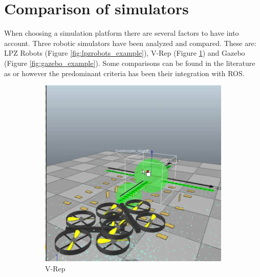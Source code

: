\section{Comparison of simulators} %
\label{sec:sim_comparison_of_simulators}
When choosing a simulation platform there are several factors to have into account.
Three robotic simulators have been analyzed and compared. 
These are: LPZ Robots \cite{lpzrobots} (Figure \ref{fig:lpzrobots_example}), V-Rep \cite{vrep} (Figure \ref{fig:vrep_example}) and Gazebo \cite{gazebo} (Figure \ref{fig:gazebo_example}).
Some comparisons can be found in the literature as \cite{nogueiracomparative} or \cite{staranowicz2011survey} however the predominant criteria has been their integration with ROS.

\begin{figure}[hb!]
  \begin{subfigure}{.33\textwidth}
    \centering
    \includegraphics[width=.95\linewidth]{figures/vrep_example}
    \caption{V-Rep}
    \label{fig:vrep_example}
  \end{subfigure}%
  \begin{subfigure}{.33\textwidth}
    \centering

\end{subfigure}
\end{figure}
